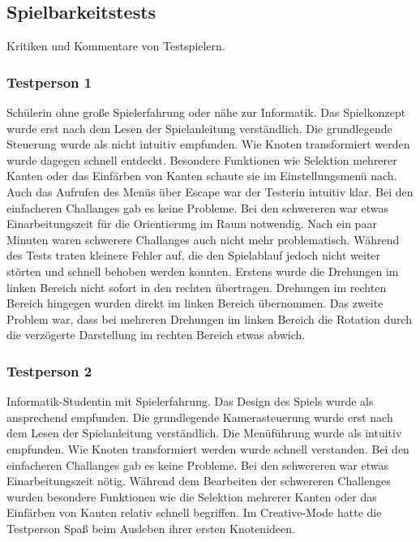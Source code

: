 %



\newpage



\label{Abschnitt:Tests:Protokoll:Abnahme}



\subsection*{Spielbarkeitstests}

Kritiken und Kommentare von Testspielern.\\



\subsubsection*{Testperson 1}

Schülerin ohne große Spielerfahrung oder nähe zur Informatik. Das Spielkonzept wurde erst nach dem Lesen der Spielanleitung verständlich. Die grundlegende Steuerung wurde als nicht intuitiv empfunden. Wie Knoten transformiert werden wurde dagegen schnell entdeckt. Besondere Funktionen wie Selektion mehrerer Kanten oder das Einfärben von Kanten schaute sie im Einstellungsmenü nach. Auch das Aufrufen des Menüs über Escape war der Testerin intuitiv klar. Bei den einfacheren Challanges gab es keine Probleme. Bei den schwereren war etwas Einarbeitungszeit für die Orientierung im Raum notwendig. Nach ein paar Minuten waren schwerere Challanges auch nicht mehr problematisch. Während des Tests traten kleinere Fehler auf, die den Spielablauf jedoch nicht weiter störten und schnell behoben werden konnten. Erstens wurde die Drehungen im linken Bereich nicht sofort in den rechten übertragen. Drehungen im rechten Bereich hingegen wurden direkt im linken Bereich übernommen. Das zweite Problem war, dass bei mehreren Drehungen im linken Bereich die Rotation durch die verzögerte Darstellung im rechten Bereich etwas abwich.

\subsubsection*{Testperson 2}

Informatik-Studentin mit Spielerfahrung. Das Design des Spiels wurde als ansprechend empfunden. Die grundlegende Kamerasteuerung wurde erst nach dem Lesen der Spielanleitung verständlich. Die Menüführung wurde als intuitiv empfunden. Wie Knoten transformiert werden wurde schnell verstanden. Bei den einfacheren Challanges gab es keine Probleme. Bei den schwereren war etwas Einarbeitungszeit nötig. Während dem Bearbeiten der schwereren Challenges wurden besondere Funktionen wie die Selektion mehrerer Kanten oder das Einfärben von Kanten relativ schnell begriffen. Im Creative-Mode hatte die Testperson Spaß beim Ausleben ihrer ersten Knotenideen.

